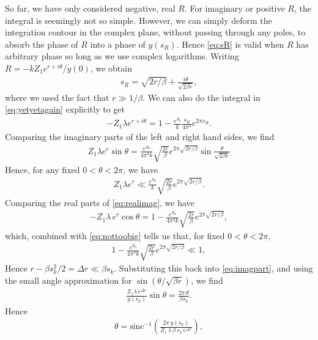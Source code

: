 \documentclass[11pt]{article}
\newcommand{\smax}{s_k}
\numberwithin{equation}{section}
\begin{document}
So far, we have only considered negative, real $R$. For imaginary or positive $R$, the integral is seemingly not so simple. However, we can simply deform the integration contour in the complex plane, without passing through any poles, to absorb the phase of $R$ into a phase of $y(s_R)$. Hence \eqref{eq:sR} is valid when $R$ has arbitrary phase so long as we use complex logarithms. Writing $R = -k Z_1e^{r + i \theta}/y(0)$, we obtain
\begin{align}
s_R = \sqrt{2r/\beta } + \frac{i \theta}{\sqrt{2 \beta  r}},
\end{align}
where we used the fact that $r \gg 1/\beta$. We can also do the integral in \eqref{eq:yetyetagain} explicitly to get
\begin{align} \label{eq:realimag}
- Z_1 \lambda e^{r + i \theta} = 1 - \frac{e^{S_0}}{k} \frac{s_R}{4 \pi ^3} e^{2 \pi s_R}.
\end{align}
Comparing the imaginary parts of the left and right hand sides, we find 
\begin{align} \label{eq:imagpart}
Z_1 \lambda e^{r} \sin \theta = \frac{e^{S_0}}{4 \pi^3 k} \sqrt{\frac{2r}{\beta  }} e^{2 \pi\sqrt{2r/\beta }} \sin \frac{\theta}{\sqrt{2 \beta  r}}
\end{align}
Hence, for any fixed $0 < \theta < 2 \pi$, we have
\begin{align} \label{eq:nottoobig}
Z_1 \lambda e^{r} \ll \frac{e^{S_0}}{k} \sqrt{\frac{2r}{\beta  }} e^{2 \pi \sqrt{2r/\beta }}.
\end{align}
Comparing the real parts of \eqref{eq:realimag}, we have
\begin{align} \label{eq:realpart}
- Z_1 \lambda \,e^{r} \cos \theta = 1 - \frac{e^{S_0}}{4 \pi^3 k} \sqrt{\frac{2r}{\beta  }} e^{2 \pi \sqrt{2 r /\beta}},
\end{align}
which, combined with \eqref{eq:nottoobig} tells us that, for fixed $0 < \theta < 2 \pi$,
\begin{align} \label{eq:sRapproxsk}
1 - \frac{e^{S_0}}{4 \pi^3 k} \sqrt{\frac{2 r}{\beta }} e^{2 \pi \sqrt{2r/\beta }} \ll 1,
\end{align}
Hence $r - \beta \smax^2/2 = \Delta r \ll \beta\smax $. Substituting this back into \eqref{eq:imagpart}, and using the small angle approximation for $\sin (\theta/\sqrt{\beta  r})$, we find
\begin{align}
\frac{Z_1 \lambda \,e^{\Delta r}}{y(\smax)}  \sin \theta = \frac{2 \pi \,\theta}{\beta \smax}.
\end{align}
Hence
\begin{align}
\theta = \text{sinc}^{-1}\left(\frac{2 \pi \,y(\smax)}{ Z_1\, \lambda \,\beta\, \smax\, e^{\Delta r}} \right),
\end{align}
\end{document}
